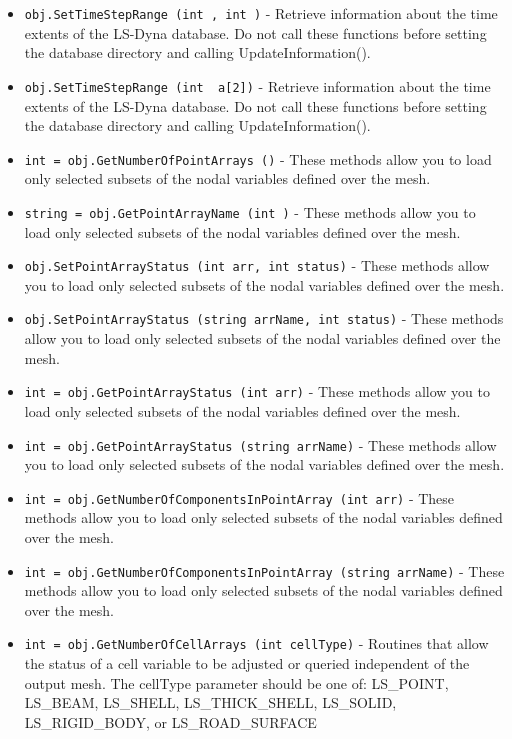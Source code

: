 \begin{itemize}
\item  \verb|obj.SetTimeStepRange (int , int )| -  Retrieve information about the time extents of the LS-Dyna database.
 Do not call these functions before setting the database directory and
 calling UpdateInformation().

\item  \verb|obj.SetTimeStepRange (int  a[2])| -  Retrieve information about the time extents of the LS-Dyna database.
 Do not call these functions before setting the database directory and
 calling UpdateInformation().

\item  \verb|int = obj.GetNumberOfPointArrays ()| -  These methods allow you to load only selected subsets of the nodal
 variables defined over the mesh.

\item  \verb|string = obj.GetPointArrayName (int )| -  These methods allow you to load only selected subsets of the nodal
 variables defined over the mesh.

\item  \verb|obj.SetPointArrayStatus (int arr, int status)| -  These methods allow you to load only selected subsets of the nodal
 variables defined over the mesh.

\item  \verb|obj.SetPointArrayStatus (string arrName, int status)| -  These methods allow you to load only selected subsets of the nodal
 variables defined over the mesh.

\item  \verb|int = obj.GetPointArrayStatus (int arr)| -  These methods allow you to load only selected subsets of the nodal
 variables defined over the mesh.

\item  \verb|int = obj.GetPointArrayStatus (string arrName)| -  These methods allow you to load only selected subsets of the nodal
 variables defined over the mesh.

\item  \verb|int = obj.GetNumberOfComponentsInPointArray (int arr)| -  These methods allow you to load only selected subsets of the nodal
 variables defined over the mesh.

\item  \verb|int = obj.GetNumberOfComponentsInPointArray (string arrName)| -  These methods allow you to load only selected subsets of the nodal
 variables defined over the mesh.

\item  \verb|int = obj.GetNumberOfCellArrays (int cellType)| -  Routines that allow the status of a cell variable to be adjusted or
 queried independent of the output mesh.  The  cellType parameter
 should be one of: LS\_POINT, LS\_BEAM, LS\_SHELL, LS\_THICK\_SHELL,
 LS\_SOLID, LS\_RIGID\_BODY, or LS\_ROAD\_SURFACE


\end{itemize}
